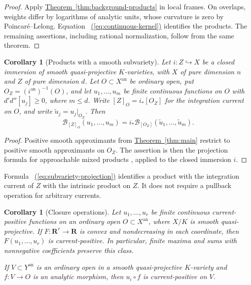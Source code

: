 \documentclass[11pt]{amsart}
\newtheorem{corollary}[theorem]{Corollary}
\theoremstyle{definition}
\theoremstyle{remark}
\numberwithin{equation}{section}
\newcommand{\ddc}{d'd''}
\newcommand{\an}{\mathrm{an}}
\newcommand{\R}{\mathbf R}
\newcommand{\namedref}[2]{%
 \begingroup
 \ifstrequal{#1}{Section}{\hypersetup{linkcolor=sectionteal}}{%
  \ifstrequal{#1}{Appendix}{\hypersetup{linkcolor=sectionteal}}{}}%
 \hyperref[#2]{#1~\ref*{#2}}%
 \endgroup}
\renewcommand{\eqref}[1]{%
 \begingroup\hypersetup{linkcolor=equationviolet}%
 \hyperref[#1]{\textup{(\ref*{#1})}}%
 \endgroup}
\begin{document}
\begin{proof}
Apply \namedref{Theorem}{thm:background-products} in local frames. On overlaps,
weights differ by logarithms of analytic units, whose curvature is zero
by Poincar\'e--Lelong. Equation~\eqref{eq:continuous-kernel} identifies
the products. The remaining assertions, including rational
normalization, follow from the same theorem.
\end{proof}

\begin{corollary}[Products with a smooth subvariety]
\label{cor:smooth-subvariety-products}
Let \(i:Z\hookrightarrow X\) be a closed immersion of smooth
quasi-projective \(K\)-varieties, with \(X\) of pure dimension \(n\)
and \(Z\) of pure dimension \(d\).
Let \(O\subset X^\an\) be ordinary open, put
\(O_Z=(i^\an)^{-1}(O)\), and let \(u_1,\ldots,u_m\) be finite
continuous functions on \(O\) with \(\ddc[u_j]\geq0\), where
\(m\leq d\). Write \([Z]_O=i_*[O_Z]\) for the integration current
on \(O\), and write \(\widetilde u_j=u_j|_{O_Z}\). Then
\begin{equation}\label{eq:subvariety-projection}
 \mathcal B_{[Z]_O}(u_1,\ldots,u_m)
 =i_*\mathcal B_{[O_Z]}(\widetilde u_1,\ldots,\widetilde u_m).
\end{equation}
\end{corollary}

\begin{proof}
Positive smooth approximants from \namedref{Theorem}{thm:main} restrict to
positive smooth approximants on \(O_Z\). The assertion is then the
projection formula for approachable mixed products
\cite[Proposition 8.7.5]{CLD25}, applied to the closed immersion \(i\).
\end{proof}

Formula~\eqref{eq:subvariety-projection} identifies a product with the
integration current of \(Z\) with the intrinsic product on \(Z\).
It does not require a pullback operation for arbitrary currents.

\begin{corollary}[Closure operations]\label{cor:closure-operations}
Let \(u_1,\ldots,u_r\) be finite continuous current-positive functions
on an ordinary open \(O\subset X^\an\), where \(X/K\) is smooth
quasi-projective. If \(F:\R^r\to\R\) is convex and nondecreasing in
each coordinate, then \(F(u_1,\ldots,u_r)\) is current-positive.
In particular, finite maxima and sums with nonnegative coefficients
preserve this class.

If \(V\subset Y^\an\) is an ordinary open in a smooth
quasi-projective \(K\)-variety and \(f:V\to O\) is an analytic
morphism, then \(u_i\circ f\) is current-positive on \(V\).
\end{corollary}
\end{document}

